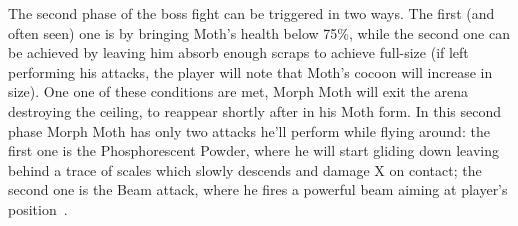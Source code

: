 The second phase of the boss fight can be triggered in two ways. The first (and often seen) one is by bringing Moth's health below 75\%, while the second one can be achieved by leaving him absorb enough scraps to achieve full-size (if left performing his attacks, the player will note that Moth's cocoon will increase in size). One one of these conditions are met, Morph Moth will exit the arena destroying the ceiling, to reappear shortly after in his Moth form. In this second phase Morph Moth has only two attacks he'll perform while flying around: the first one is the Phosphorescent Powder, where he will start gliding down leaving behind a trace of scales which slowly descends and damage X on contact; the second one is the Beam attack, where he fires a powerful beam aiming at player's position~\cite{book:Compendium}.


